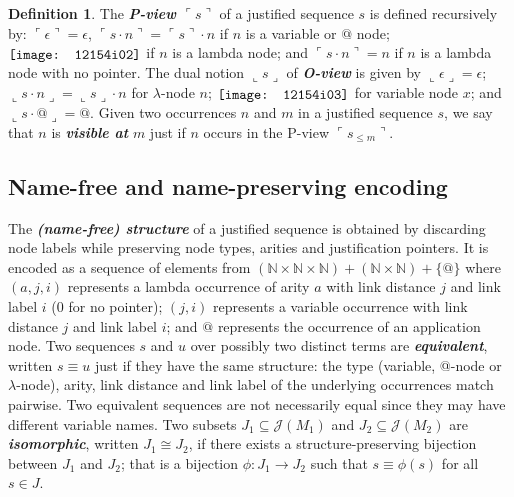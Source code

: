 \documentclass[xchauthor,chkrefs,GCNS,amsmath,amsthm,rotating,leaveRGB]{tcsg}
\renewcommand{\index}[1]{}
\theoremstyle{plain}
\theoremstyle{definition}
\newtheorem{definition}{Definition}[section]
\def\structisomorphic{\cong}
\def\justseqset{\mathcal{J}}
\begin{document}
\begin{definition}\label{def:views}
The \textbf{\emph{P-view $\ulcorner  s \urcorner  $}}\index{P-view $\ulcorner
s \urcorner  $} of a justified sequence $s$ is defined recursively by:
$\ulcorner  \epsilon   \urcorner   = \epsilon $, $\ulcorner  s \cdot  n
\urcorner   =  \ulcorner  s \urcorner   \cdot n$ if $n$ is a variable or $@$
node; $\raisebox{-1pt}{\texttt{[image: 12154i02]}}$ if $n$ is a lambda node; and  $\ulcorner
s \cdot  n  \urcorner    =  n$ if $n$ is a lambda node with no pointer. The
dual notion $\llcorner  s \lrcorner  $ of
\textbf{\emph{O-view}}\index{O-view} is given by $\llcorner  \epsilon
\lrcorner   = \epsilon $; $\llcorner  s \cdot  n  \lrcorner    =  \llcorner
s \lrcorner   \cdot n$ for $\lambda $-node $n$; $\raisebox{-1pt}{\texttt{[image: 12154i03]}}$
for variable node $x$; and $\llcorner  s \cdot  @  \lrcorner   = @$. Given
two occurrences $n$ and $m$ in a justified sequence $s$, we say that $n$ is
\textbf{\emph{visible at}}\index{visible at} $m$ just if $n$ occurs in the
P-view $\ulcorner  s_{\leq  m} \urcorner  $.
\end{definition}

\subsection{Name-free and name-preserving encoding}\label{sec2.6}

The \textbf{\emph{(name-free) structure}}\index{(name-free) structure} of a
justified sequence is obtained by discarding node labels while preserving
node types, arities and justification pointers. It is encoded as a sequence
of elements from $(\mathbb {N}\times \mathbb {N}\times \mathbb {N}) +
(\mathbb {N}\times \mathbb {N}) + \{ @ \}$ where $(a, j, i)$ represents a
lambda occurrence of arity $a$ with link distance $j$ and link label $i$ ($0$
for no pointer); $(j, i)$ represents a variable occurrence with link distance
$j$ and link label $i$; and $@$ represents the occurrence of an application
node. Two sequences $s$ and $u$ over possibly two distinct terms are
\textbf{\emph{equivalent}}\index{equivalent}, written $s \equiv u$ just if
they have the same structure: the type (variable, @-node or $\lambda $-node),
arity, link distance and link label of the underlying occurrences match
pairwise. Two equivalent sequences are not necessarily equal since they may
have different variable names. Two subsets $J_{1}\subseteq \justseqset
(M_{1})$ and $J_{2}\subseteq \justseqset (M_{2})$ are
\textbf{\emph{isomorphic}}\index{isomorphic}, written $J_{1}\structisomorphic
J_{2}$, if  there exists a structure-preserving bijection between $J_{1}$ and
$J_{2}$; that is a bijection $\phi :J_{1}\longrightarrow J_{2}$ such that
$s\equiv \phi (s)$ for all $s\in J$.
\end{document}
